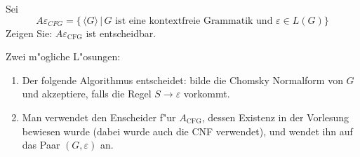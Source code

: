 Sei
\[
A\varepsilon_{CFG}=\{
\,\langle G\rangle\,|\,\text{$G$ ist eine kontextfreie Grammatik und $\varepsilon\in L(G)$}
\}
\]
Zeigen Sie: $A\varepsilon_{\text{CFG}}$ ist entscheidbar.

\begin{loesung}
Zwei m"ogliche L"osungen:
\begin{enumerate}
\item
Der folgende Algorithmus entscheidet: bilde die Chomsky Normalform von $G$
und akzeptiere, falls die Regel $S\to\varepsilon$ vorkommt.
\item
Man verwendet den Enscheider f"ur $A_{\text{CFG}}$, dessen
Existenz in der Vorlesung bewiesen wurde (dabei wurde auch die CNF
verwendet), und wendet ihn auf das Paar $(G,\varepsilon)$ an.
\end{enumerate}
\end{loesung}
